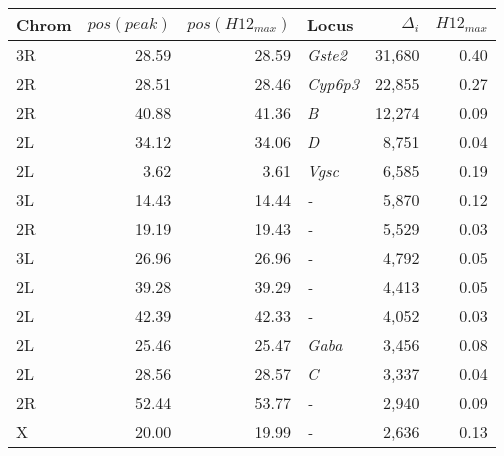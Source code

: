 \begin{tabular}{lrrlrr}
\toprule
Chrom & $pos(peak)$ & $pos(H12_{max})$ &            Locus & $\Delta_{i}$ & $H12_{max}$ \\
\midrule
   3R &       28.59 &            28.59 &   \textit{Gste2} &       31,680 &        0.40 \\
   2R &       28.51 &            28.46 &  \textit{Cyp6p3} &       22,855 &        0.27 \\
   2R &       40.88 &            41.36 &       \textit{B} &       12,274 &        0.09 \\
   2L &       34.12 &            34.06 &       \textit{D} &        8,751 &        0.04 \\
   2L &        3.62 &             3.61 &    \textit{Vgsc} &        6,585 &        0.19 \\
   3L &       14.43 &            14.44 &       \textit{-} &        5,870 &        0.12 \\
   2R &       19.19 &            19.43 &       \textit{-} &        5,529 &        0.03 \\
   3L &       26.96 &            26.96 &       \textit{-} &        4,792 &        0.05 \\
   2L &       39.28 &            39.29 &       \textit{-} &        4,413 &        0.05 \\
   2L &       42.39 &            42.33 &       \textit{-} &        4,052 &        0.03 \\
   2L &       25.46 &            25.47 &    \textit{Gaba} &        3,456 &        0.08 \\
   2L &       28.56 &            28.57 &       \textit{C} &        3,337 &        0.04 \\
   2R &       52.44 &            53.77 &       \textit{-} &        2,940 &        0.09 \\
    X &       20.00 &            19.99 &       \textit{-} &        2,636 &        0.13 \\
\bottomrule
\end{tabular}
